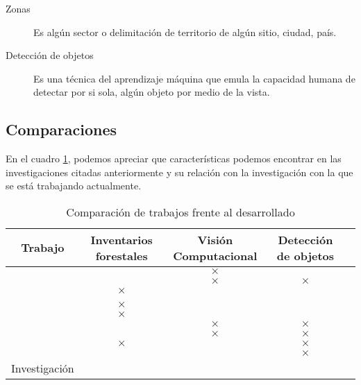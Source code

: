 \begin{description}
\item[Zonas]{Es algún sector o delimitación de territorio de algún sitio, ciudad, país.}
\end{description}

\begin{description}
\item[Detección de objetos]{Es una técnica del aprendizaje máquina que emula la capacidad humana de detectar por si sola, algún objeto por medio de la vista.}
\end{description}

\newpage

\subsection{Comparaciones}
En el cuadro \ref{tab:Comparación de trabajos frente al desarrollado}, podemos apreciar que características podemos encontrar en las investigaciones citadas anteriormente y su relación con la investigación con la que se está trabajando actualmente.\\
\renewcommand{\tablename}{Cuadro}
\begin{table}[hbt!]
	{\centering
	\caption{Comparación de trabajos frente al desarrollado}
	\begin{adjustbox}{width=\textwidth}
		\begin{tabular}{|c|c|c|c|c|}
			\hline
			Trabajo &  Inventarios forestales &  Visión Computacional & Detección de objetos\\
			\hline
			\cite{rf1} & \checkmark & $\times$ & \checkmark \\
			\hline
			\cite{rf2}&  \checkmark  &  $\times$ & $\times$  \\
			\hline
			\cite{rf3}& $\times$ & \checkmark & \checkmark  \\
			\hline	
			\cite{rf9}& \checkmark & \checkmark & \checkmark  \\
			\hline
			\cite{rf10}& $\times$ & \checkmark & \checkmark  \\
			\hline
			\cite{rf11}& $\times$ & \checkmark & \checkmark  \\
			\hline
			\cite{rf12}& \checkmark  & $\times$ & $\times$  \\
			\hline
			\cite{rf13}& \checkmark & $\times$ & $\times$  \\
			\hline
			\cite{rf14}&  $\times$ & \checkmark & $\times$   \\
			\hline
			\cite{rf15}& \checkmark & \checkmark & $\times$  \\
			\hline
			Investigación & \checkmark & \checkmark & \checkmark \\
			\hline
		\end{tabular}
	\end{adjustbox}
	\label{tab:Comparación de trabajos frente al desarrollado}}
\end{table}

